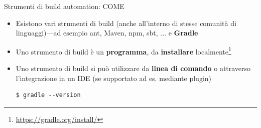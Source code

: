 \documentclass[xcolor=dvipsnames,presentation]{beamer}
\begin{document}
\begin{frame}[fragile]{Strumenti di build automation: COME}

\begin{itemize}
\item Esistono vari strumenti di build (anche all'interno di stesse comunit{\`a} di linguaggi)---ad esempio ant, Maven, npm, sbt, ... e \textbf{Gradle}
\item Uno strumento di build è un \textbf{programma}, da \textbf{installare} localmente\footnote{\url{https://gradle.org/install/}}
\item  Uno strumento di build si può utilizzare da \textbf{linea di comando} o attraverso l'integrazione in un IDE (se supportato ad es. mediante plugin)
\begin{lstlisting}
$ gradle --version
\end{lstlisting}
\end{itemize}

\end{frame}
\end{document}
